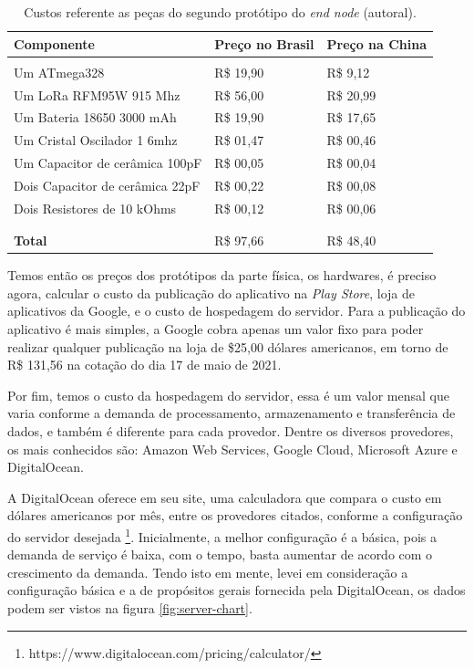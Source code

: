 \begin{table}[H]
  \centering 
  \scalebox{1} {
    \begin{tabular}{l | l | l}
    \textbf{Componente}&\textbf{Preço no Brasil}&\textbf{Preço na China}\\[5pt] \hline
    &&\\
    Um ATmega328&R\$ 19,90&R\$ 9,12 \\[5pt]
    Um LoRa RFM95W 915 Mhz&R\$ 56,00&R\$ 20,99 \\[5pt]
    Um Bateria 18650 3000 mAh&R\$ 19,90 &R\$ 17,65 \\[5pt]
    Um Cristal Oscilador 1 6mhz&R\$ 01,47&R\$ 00,46 \\[5pt]
    Um Capacitor de cerâmica 100pF&R\$ 00,05&R\$ 00,04 \\[5pt]
    Dois Capacitor de cerâmica 22pF&R\$ 00,22&R\$ 00,08 \\[5pt]
    Dois Resistores de 10 kOhms&R\$ 00,12&R\$ 00,06 \\
    &&\\ \hline
    &&\\
    \textbf{Total}&R\$ 97,66&R\$ 48,40 \\[5pt]
    \end{tabular}
  }
  \caption{Custos referente as peças do segundo protótipo do \textit{end node} (autoral).}
  \label{tab:costs-2-proto}
\end{table}

Temos então os preços dos protótipos da parte física, os hardwares, é preciso agora, calcular o custo da publicação do aplicativo na \textit{Play Store}, loja de aplicativos da Google, e o custo de hospedagem do servidor. Para a publicação do aplicativo é mais simples, a Google cobra apenas um valor fixo para poder realizar qualquer publicação na loja de \$25,00 dólares americanos, em torno de R\$ 131,56 na cotação do dia 17 de maio de 2021.

Por fim, temos o custo da hospedagem do servidor, essa é um valor mensal que varia conforme a demanda de processamento, armazenamento e transferência de dados, e também é diferente para cada provedor. Dentre os diversos provedores, os mais conhecidos são: Amazon Web Services, Google Cloud, Microsoft Azure e DigitalOcean.

A DigitalOcean oferece em seu site, uma calculadora que compara o custo em dólares americanos por mês, entre os provedores citados, conforme a configuração do servidor desejada \footnote{https://www.digitalocean.com/pricing/calculator/}. Inicialmente, a melhor configuração é a básica, pois a demanda de serviço é baixa, com o tempo, basta aumentar de acordo com o crescimento da demanda. Tendo isto em mente, levei em consideração a configuração básica e a de propósitos gerais fornecida pela DigitalOcean, os dados podem ser vistos na figura \ref{fig:server-chart}.


